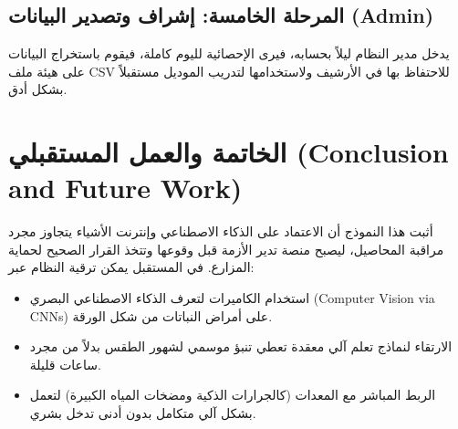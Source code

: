 \documentclass[12pt,a4paper]{article}
\begin{document}
\subsection{المرحلة الخامسة: إشراف وتصدير البيانات (Admin)}
يدخل مدير النظام ليلاً بحسابه، فيرى الإحصائية لليوم كاملة، فيقوم باستخراج البيانات على هيئة ملف CSV للاحتفاظ بها في الأرشيف ولاستخدامها لتدريب الموديل مستقبلاً بشكل أدق.

\vspace{0.5cm}

\section{الخاتمة والعمل المستقبلي (Conclusion and Future Work)}
أثبت هذا النموذج أن الاعتماد على الذكاء الاصطناعي وإنترنت الأشياء يتجاوز مجرد مراقبة المحاصيل، ليصبح منصة تدير الأزمة قبل وقوعها وتتخذ القرار الصحيح لحماية المزارع. في المستقبل يمكن ترقية النظام عبر:
\begin{itemize}
    \item استخدام الكاميرات لتعرف الذكاء الاصطناعي البصري (Computer Vision via CNNs) على أمراض النباتات من شكل الورقة.
    \item الارتقاء لنماذج تعلم آلي معقدة تعطي تنبؤ موسمي لشهور الطقس بدلاً من مجرد ساعات قليلة.
    \item الربط المباشر مع المعدات (كالجرارات الذكية ومضخات المياه الكبيرة) لتعمل بشكل آلي متكامل بدون أدنى تدخل بشري.
\end{itemize}
\end{document}
